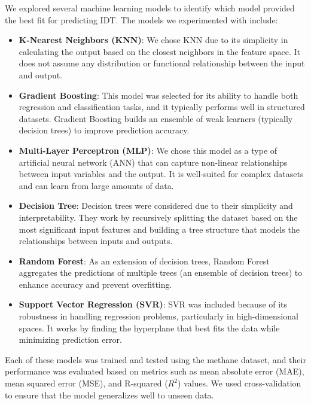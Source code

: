 \documentclass[12pt]{report}
\begin{document}
We explored several machine learning models to identify which model provided the best fit for predicting IDT. The models we experimented with include:
\begin{itemize}
    \item \textbf{K-Nearest Neighbors (KNN)}: We chose KNN due to its simplicity in calculating the output based on the closest neighbors in the feature space. It does not assume any distribution or functional relationship between the input and output.
    
    \item \textbf{Gradient Boosting}: This model was selected for its ability to handle both regression and classification tasks, and it typically performs well in structured datasets. Gradient Boosting builds an ensemble of weak learners (typically decision trees) to improve prediction accuracy.

    \item \textbf{Multi-Layer Perceptron (MLP)}: We chose this model as a type of artificial neural network (ANN) that can capture non-linear relationships between input variables and the output. It is well-suited for complex datasets and can learn from large amounts of data.

    \item \textbf{Decision Tree}: Decision trees were considered due to their simplicity and interpretability. They work by recursively splitting the dataset based on the most significant input features and building a tree structure that models the relationships between inputs and outputs.

    \item \textbf{Random Forest}: As an extension of decision trees, Random Forest aggregates the predictions of multiple trees (an ensemble of decision trees) to enhance accuracy and prevent overfitting.

    \item \textbf{Support Vector Regression (SVR)}: SVR was included because of its robustness in handling regression problems, particularly in high-dimensional spaces. It works by finding the hyperplane that best fits the data while minimizing prediction error.
\end{itemize}

Each of these models was trained and tested using the methane dataset, and their performance was evaluated based on metrics such as mean absolute error (MAE), mean squared error (MSE), and R-squared (\(R^2\)) values. We used cross-validation to ensure that the model generalizes well to unseen data.
\end{document}
